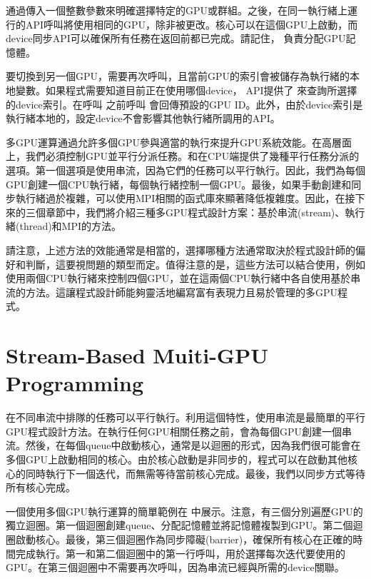  通過傳入一個整數參數來明確選擇特定的GPU或群組。之後，在同一執行緒上運行的API呼叫將使用相同的GPU，除非被更改。核心可以在這個GPU上啟動，而device同步API可以確保所有任務在返回前都已完成。請記住， 負責分配GPU記憶體。

要切換到另一個GPU，需要再次呼叫，且當前GPU的索引會被儲存為執行緒的本地變數。如果程式需要知道目前正在使用哪個device， API提供了 來查詢所選擇的device索引。在呼叫 之前呼叫 會回傳預設的GPU ID。此外，由於device索引是執行緒本地的，設定device不會影響其他執行緒所調用的API。

多GPU運算通過允許多個GPU參與適當的執行來提升GPU系統效能。在高層面上，我們必須控制GPU並平行分派任務。和在CPU端提供了幾種平行任務分派的選項。第一個選項是使用串流，因為它們的任務可以平行執行。因此，我們為每個GPU創建一個CPU執行緒，每個執行緒控制一個GPU。最後，如果手動創建和同步執行緒過於複雜，可以使用MPI相關的函式庫來顯著降低複雜度。因此，在接下來的三個章節中，我們將介紹三種多GPU程式設計方案：基於串流(stream)、執行緒(thread)和MPI的方法。

請注意，上述方法的效能通常是相當的，選擇哪種方法通常取決於程式設計師的偏好和判斷，這要視問題的類型而定。值得注意的是，這些方法可以結合使用，例如使用兩個CPU執行緒來控制四個GPU，並在這兩個CPU執行緒中各自使用基於串流的方法。這讓程式設計師能夠靈活地編寫富有表現力且易於管理的多GPU程式。

\section{Stream-Based Muiti-GPU Programming}

在不同串流中排隊的任務可以平行執行。利用這個特性，使用串流是最簡單的平行GPU程式設計方法。在執行任何GPU相關任務之前，會為每個GPU創建一個串流。然後，在每個queue中啟動核心，通常是以迴圈的形式，因為我們很可能會在多個GPU上啟動相同的核心。由於核心啟動是非同步的，程式可以在啟動其他核心的同時執行下一個迭代，而無需等待當前核心完成。最後，我們以同步方式等待所有核心完成。

一個使用多個GPU執行運算的簡單範例在 
 中展示。注意，有三個分別遍歷GPU的獨立迴圈。第一個迴圈創建queue、分配記憶體並將記憶體複製到GPU。第二個迴圈啟動核心。最後，第三個迴圈作為同步障礙(barrier)，確保所有核心在正確的時間完成執行。第一和第二個迴圈中的第一行呼叫，用於選擇每次迭代要使用的GPU。在第三個迴圈中不需要再次呼叫，因為串流已經與所需的device關聯。

